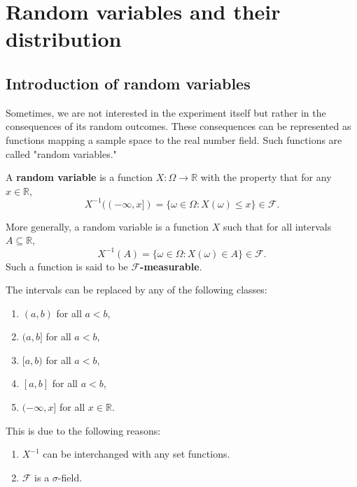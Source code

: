\documentclass{huhtakm-template-book}
\begin{document}
\chapter{Random variables and their distribution}
\section{Introduction of random variables}
    Sometimes, we are not interested in the experiment itself but rather in the consequences of its random outcomes. These consequences can be represented as functions mapping a sample space to the real number field. Such functions are called "random variables."
    \begin{defn}
        A \textbf{random variable} is a function $X:\Omega\to\mathbb{R}$ with the property that for any $x\in\mathbb{R}$,
        \begin{equation*}
            X^{-1}((-\infty,x])=\{\omega\in\Omega:X(\omega)\leq x\}\in\mathcal{F}.
        \end{equation*}
    \end{defn}
    \begin{rem}
        More generally, a random variable is a function $X$ such that for all intervals $A\subseteq\mathbb{R}$,
        \begin{equation*}
            X^{-1}(A)=\{\omega\in\Omega: X(\omega)\in A\}\in\mathcal{F}.
        \end{equation*}
        Such a function is said to be \textbf{$\mathcal{F}$-measurable}.
    \end{rem}
    \begin{rem}
        The intervals can be replaced by any of the following classes:
        \begin{enumerate}
            \item $(a,b)$ for all $a<b$,
            \item $(a,b]$ for all $a<b$,
            \item $[a,b)$ for all $a<b$,
            \item $[a,b]$ for all $a<b$,
            \item $(-\infty,x]$ for all $x\in\mathbb{R}$.
        \end{enumerate}
        This is due to the following reasons:
        \begin{enumerate}
            \item $X^{-1}$ can be interchanged with any set functions.
            \item $\mathcal{F}$ is a $\sigma$-field.
        \end{enumerate}
    \end{rem}
\end{document}
